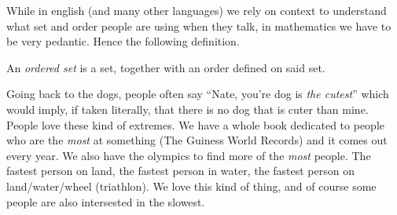 \documentclass[../../templates/section]{subfiles}
\begin{document}
While in english (and many other languages) we rely on context to understand
what set and order people are using when they talk, in mathematics we have to
be very pedantic. Hence the following definition.

\begin{definition}\label{def:ordered-set}
    An \emph{ordered set} is a set, together with an order defined on said set.
\end{definition}

Going back to the dogs, people often say ``Nate, you're dog is \emph{the
cutest}'' which would imply, if taken literally, that there is no dog that is
cuter than mine. People love these kind of extremes. We have a whole book
dedicated to people who are the \emph{most} at something (The Guiness World
Records) and it comes out every year. We also have the olympics to find more of
the \emph{most} people. The fastest person on land, the fastest person in
water, the fastest person on land/water/wheel (triathlon). We love this kind of
thing, and of course some people are also intersested in the slowest.
\end{document}
